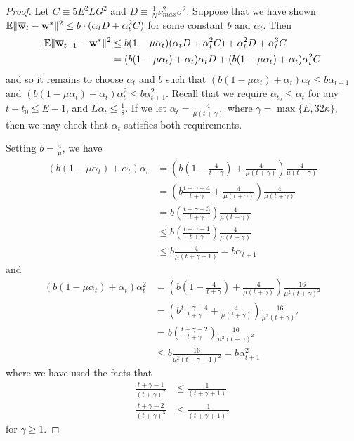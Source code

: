 \begin{proof}
	Let $C\equiv5E^{2}LG^{2}$ and $D\equiv\frac{1}{N}\nu_{max}^{2}\sigma^{2}$.
	Suppose that we have shown $\mathbb{E}\|{\overline{\mathbf{w}}}_{t}-{\mathbf{w}}^{\ast}\|^{2}\leq b\cdot(\alpha_{t}D+\alpha_{t}^{2}C)$
	for some constant $b$ and $\alpha_{t}$. Then 
	\begin{align*}
	\mathbb{E}\|{\overline{\mathbf{w}}}_{t+1}-{\mathbf{w}}^{\ast}\|^{2} & \leq b(1-\mu\alpha_{t})(\alpha_{t}D+\alpha_{t}^{2}C)+\alpha_{t}^{2}D+\alpha_{t}^{3}C\\
	& =(b(1-\mu\alpha_{t})+\alpha_{t})\alpha_{t}D+(b(1-\mu\alpha_{t})+\alpha_{t})\alpha_{t}^{2}C
	\end{align*}
	and so it remains to choose $\alpha_{t}$ and $b$ such that $(b(1-\mu\alpha_{t})+\alpha_{t})\alpha_{t}\leq b\alpha_{t+1}$
	and $(b(1-\mu\alpha_{t})+\alpha_{t})\alpha_{t}^{2}\leq b\alpha_{t+1}^{2}$.
	Recall that we require $\alpha_{t_{0}}\leq\alpha_{t}$ for any $t-t_{0}\leq E-1$,
	and $L\alpha_{t}\leq\frac{1}{8}$. If we let $\alpha_{t}=\frac{4}{\mu(t+\gamma)}$
	where $\gamma=\max\{E,32\kappa\}$, then we may check that $\alpha_{t}$
	satisfies both requirements. 
	
	Setting $b=\frac{4}{\mu}$, we have 
	\begin{align*}
	(b(1-\mu\alpha_{t})+\alpha_{t})\alpha_{t} & =\left(b(1-\frac{4}{t+\gamma})+\frac{4}{\mu(t+\gamma)}\right)\frac{4}{\mu(t+\gamma)}\\
	& =\left(b\frac{t+\gamma-4}{t+\gamma}+\frac{4}{\mu(t+\gamma)}\right)\frac{4}{\mu(t+\gamma)}\\
	& =b(\frac{t+\gamma-3}{t+\gamma})\frac{4}{\mu(t+\gamma)}\\
	& \leq b(\frac{t+\gamma-1}{t+\gamma})\frac{4}{\mu(t+\gamma)}\\
	& \leq b\frac{4}{\mu(t+\gamma+1)}=b\alpha_{t+1}
	\end{align*}
	and 
	\begin{align*}
	(b(1-\mu\alpha_{t})+\alpha_{t})\alpha_{t}^{2} & =\left(b(1-\frac{4}{t+\gamma})+\frac{4}{\mu(t+\gamma)}\right)\frac{16}{\mu^{2}(t+\gamma)^{2}}\\
	& =\left(b\frac{t+\gamma-4}{t+\gamma}+\frac{4}{\mu(t+\gamma)}\right)\frac{16}{\mu^{2}(t+\gamma)^{2}}\\
	& =b(\frac{t+\gamma-2}{t+\gamma})\frac{16}{\mu^{2}(t+\gamma)^{2}}\\
	& \leq b\frac{16}{\mu^{2}(t+\gamma+1)^{2}}=b\alpha_{t+1}^{2}
	\end{align*}
	where we have used the facts that 
	\begin{align*}
	\frac{t+\gamma-1}{(t+\gamma)^{2}} & \leq\frac{1}{(t+\gamma+1)}\\
	\frac{t+\gamma-2}{(t+\gamma)^{3}} & \leq\frac{1}{(t+\gamma+1)^{2}}
	\end{align*}
	for $\gamma\geq1$.
	

\end{proof}
